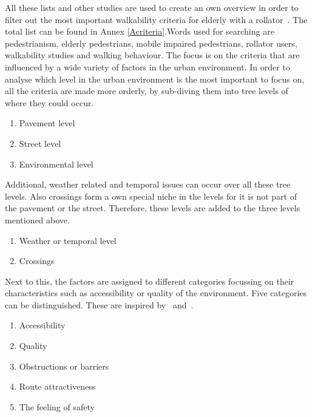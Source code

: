 All these lists and other studies are used to create an own overview in order to filter out the most important walkability criteria for elderly with a rollator~\cite{ Bernhoft2008, Verschuur2013, Dunbar2004, Wennberg2010, Borst2008, Rosenberg2012, Vine2012, Matthews2003, Hovbrandt2007, WWT2012, Wennberg2009, Stahl2008, Stahl2013}. The total list can be found in Annex \ref{Acriteria}.Words used for searching are pedestrianism, elderly pedestrians, mobile impaired pedestrians, rollator users, walkability studies and walking behaviour. The focus is on the criteria that are influenced by a wide variety of factors in the urban environment. In order to analyse which level in the urban environment is the most important to focus on, all the criteria are made more orderly, by sub-diving them into tree levels of where they could occur. 

\begin{enumerate}
\item Pavement level
\item Street level
\item Environmental level
\end{enumerate}
Additional, weather related and temporal issues can occur over all these tree levels. Also crossings form a own special niche in the levels for it is not part of the pavement or the street. Therefore, these levels are added to the three levels mentioned above.
\begin{enumerate}
\item Weather or temporal level
\item Crossings
\end{enumerate}

Next to this, the factors are assigned to different categories focussing on their characteristics such as accessibility or quality of the environment. Five categories can be distinguished. These are inspired by~\cite{Ballester2011} and~\cite{Rosenberg2012}.

\begin{enumerate}
\item Accessibility
\item Quality 
\item Obstructions or barriers
\item Route attractiveness 
\item The feeling of safety
\end{enumerate}

